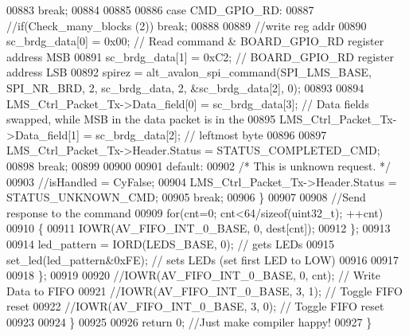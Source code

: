 \begin{DoxyCode}
00883                 \textcolor{keywordflow}{break};
00884 
00885 
00886                 \textcolor{keywordflow}{case} CMD_GPIO_RD:
00887                     \textcolor{comment}{//if(Check\_many\_blocks (2)) break;}
00888 
00889                     \textcolor{comment}{//write reg addr}
00890                     sc_brdg_data[0] = 0x00;     \textcolor{comment}{// Read command & BOARD\_GPIO\_RD register address MSB}
00891                     sc_brdg_data[1] = 0xC2;     \textcolor{comment}{// BOARD\_GPIO\_RD register address LSB}
00892                     spirez = alt_avalon_spi_command(SPI_LMS_BASE, SPI_NR_BRD, 2, 
      sc_brdg_data, 2, &sc_brdg_data[2], 0);
00893 
00894                     LMS\_Ctrl\_Packet\_Tx->Data_field[0] = sc_brdg_data[3];    \textcolor{comment}{// Data fields swapped, while
       MSB in the data packet is in the}
00895                     LMS\_Ctrl\_Packet\_Tx->Data_field[1] = sc_brdg_data[2];    \textcolor{comment}{// leftmost byte}
00896 
00897                     LMS\_Ctrl\_Packet\_Tx->Header.Status = STATUS_COMPLETED_CMD;
00898                 \textcolor{keywordflow}{break};
00899 
00900 
00901                 \textcolor{keywordflow}{default}:
00902                     \textcolor{comment}{/* This is unknown request. */}
00903                     \textcolor{comment}{//isHandled = CyFalse;}
00904                     LMS\_Ctrl\_Packet\_Tx->Header.Status = STATUS_UNKNOWN_CMD;
00905                 \textcolor{keywordflow}{break};
00906             \}
00907 
00908             \textcolor{comment}{//Send response to the command}
00909             \textcolor{keywordflow}{for}(cnt=0; cnt<64/\textcolor{keyword}{sizeof}(uint32\_t); ++cnt)
00910             \{
00911                 IOWR(AV_FIFO_INT_0_BASE, 0, dest[cnt]);
00912             \};
00913 
00914             led\_pattern = IORD(LEDS_BASE, 0);   \textcolor{comment}{// gets LEDs}
00915             set_led(led\_pattern&0xFE);          \textcolor{comment}{// sets LEDs (set first LED to LOW)}
00916 
00917 
00918         \};
00919 
00920         \textcolor{comment}{//IOWR(AV\_FIFO\_INT\_0\_BASE, 0, cnt);     // Write Data to FIFO}
00921         \textcolor{comment}{//IOWR(AV\_FIFO\_INT\_0\_BASE, 3, 1);       // Toggle FIFO reset}
00922         \textcolor{comment}{//IOWR(AV\_FIFO\_INT\_0\_BASE, 3, 0);       // Toggle FIFO reset}
00923 
00924     \}
00925 
00926     \textcolor{keywordflow}{return} 0;   \textcolor{comment}{//Just make compiler happy!}
00927 \}
\end{DoxyCode}
